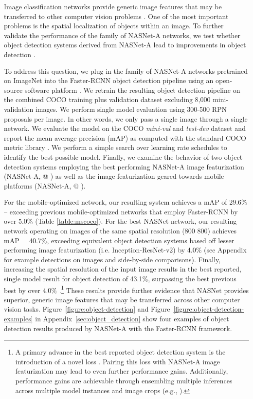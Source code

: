 Image classification networks provide generic image features that may be transferred to other computer vision problems \cite{donahue2014decaf}. One of the most important problems is the spatial localization of objects within an image. To further validate the  performance of the family of NASNet-A networks, we test whether object detection systems derived from NASNet-A lead to improvements in object detection \cite{huang2016speed}.

To address this question, we plug in the family of NASNet-A networks pretrained on ImageNet into the Faster-RCNN object detection pipeline \cite{faster_rcnn} using an open-source software platform \cite{huang2016speed}. We retrain the resulting object detection pipeline on the combined COCO training plus validation dataset excluding 8,000 mini-validation images.
We perform single model evaluation using 300-500 RPN proposals per image. In other words, we only
pass a single image through a single network. We evaluate the model on the COCO {\it mini-val} \cite{huang2016speed} and {\it test-dev} dataset and report the mean average precision (mAP) as computed with the standard COCO metric library \cite{lin2014microsoft}. We perform a simple search over learning rate schedules to identify the best possible model. Finally, we examine the behavior of two object detection systems employing the best performing NASNet-A image featurization (NASNet-A,  @ ) as well as the image featurization geared towards mobile platforms (NASNet-A,  @ ).

For the mobile-optimized network, our resulting system achieves a mAP of 29.6\% -- exceeding previous mobile-optimized networks that employ Faster-RCNN by over 5.0\% (Table \ref{table:mscoco}). For the best NASNet network, our resulting network operating on images of the same spatial resolution (800  800) achieves mAP = 40.7\%, exceeding equivalent object detection systems based off lesser performing image featurization (i.e. Inception-ResNet-v2) by 4.0\% \cite{huang2016speed,shrivastava2016beyond} (see Appendix for example detections on images and side-by-side comparisons). Finally, increasing the spatial resolution of the input image results in the best reported, single model result for object detection of 43.1\%, surpassing the best previous best by over 4.0\% \cite{lin2017focal}.\footnote{A primary advance in the best reported object detection system is the introduction of a novel loss \cite{lin2017focal}. Pairing this loss with NASNet-A image featurization may lead to even further performance gains. Additionally, performance gains are achievable through ensembling multiple inferences across multiple model instances and image crops (e.g., \cite{huang2016speed}).} These results provide further evidence that NASNet provides superior, generic image features that may be transferred across other computer vision tasks. Figure~\ref{figure:object-detection} and Figure~\ref{figure:object-detection-examples} in Appendix~\ref{sec:object_detection} show four examples of object detection results produced by NASNet-A with the Faster-RCNN framework.




